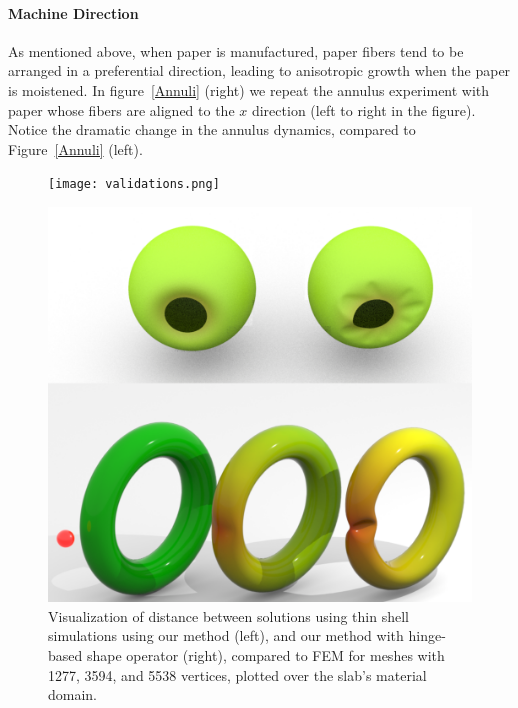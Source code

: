 \documentclass[timestamp,acmtog]{acmart}
\begin{document}
\paragraph{Machine Direction}
As mentioned above, when paper is manufactured, paper fibers tend to be arranged in a preferential direction, leading to anisotropic growth when the paper is moistened. In figure~\ref{Annuli} (right) we repeat the annulus experiment with paper whose fibers are aligned to the $x$ direction (left to right in the figure). Notice the dramatic change in the annulus dynamics, compared to Figure~\ref{Annuli} (left).

\begin{figure}[!h]
\begin{minipage}[t]{0.45\linewidth} 
    \centering
    \texttt{[image: validations.png]}
    \caption{Visualization of distance between solutions using thin shell simulations using our method (left), and our method with hinge-based shape operator (right), compared to FEM for meshes with 1277, 3594, and 5538 vertices, plotted over the slab's material domain.}    
    \label{fig:validation}
\end{minipage}
\hspace{0.1cm}
\begin{minipage}[t]{0.45\linewidth} 
    \centering
    \includegraphics[width=1\textwidth]{TorusandSphere.png}

\end{minipage}
\end{figure}
\end{document}
